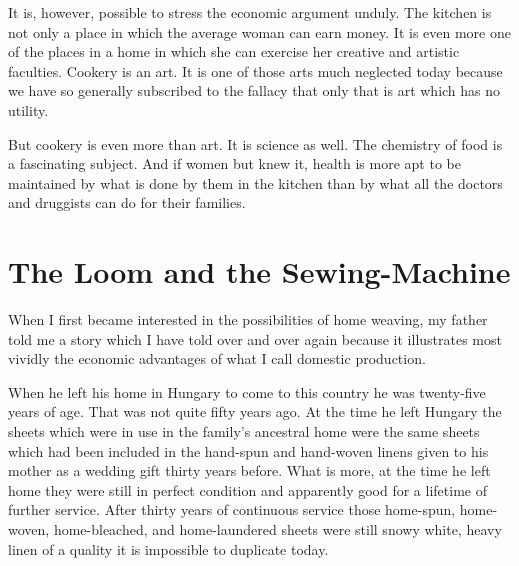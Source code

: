 \documentclass{book}
\begin{document}
It is, however, possible to stress the economic argument unduly. The kitchen is not only a place in which the average woman can earn money. It is even more one of the places in a home in which she can exercise her creative and artistic faculties. Cookery is an art. It is one of those arts much neglected today because we have so generally subscribed to the fallacy that only that is art which has no utility.

But cookery is even more than art. It is science as well. The chemistry of food is a fascinating subject. And if women but knew it, health is more apt to be maintained by what is done by them in the kitchen than by what all the doctors and druggists can do for their families.

\chapter{The Loom and the Sewing-Machine}
\label{chapter-4}
When I first became interested in the possibilities of home weaving, my father told me a story which I have told over and over again because it illustrates most vividly the economic advantages of what I call domestic production.

When he left his home in Hungary to come to this country he was twenty-five years of age. That was not quite fifty years ago. At the time he left Hungary the sheets which were in use in the family’s ancestral home were the same sheets which had been included in the hand-spun and hand-woven linens given to his mother as a wedding gift thirty years before. What is more, at the time he left home they were still in perfect condition and apparently good for a lifetime of further service. After thirty years of continuous service those home-spun, home-woven, home-bleached, and home-laundered sheets were still snowy white, heavy linen of a quality it is impossible to duplicate today.
\end{document}
